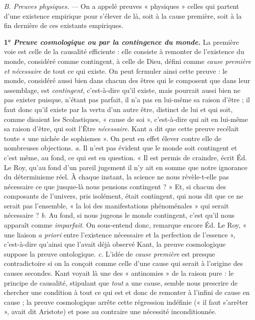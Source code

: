 {\it B. Preuves physiques.} — On a appelé preuves « physiques » celles
qui partent d’une existence empirique pour s'élever de là, soit à la
cause première, soit à la fin dernière de ces existants empiriques.

\vspace{0.24cm}
{\footnotesize
\textbf{1° \textit {\textsf{Preuve cosmologique ou par la contingence du monde.}}}
 La première voie
est celle de la causalité efficiente : elle consiste à remonter de l'existence
du monde, considéré comme contingent, à celle de Dieu, défini comme {\it cause
première et nécessaire} de tout ce qui existe. On peut fcrmuler ainsi cette
preuve : le monde, considéré aussi bien dans chacun des êtres qui le composent
que dans leur assemblage, est {\it contingent}, c'est-à-dire qu'il existe,
mais pourrait aussi bien ne pas exister puisque, n'étant pas parfait, il n’a
pas en lui-même sa raison d’être ; il faut donc qu’il existe par la vertu d’un
autre être, distinct de lui et qui soit, comme disaient les Scolastiques,
« cause de soi », c’est-à-dire qui ait en lui-même sa raison d’être, qui soit
l'Être {\it nécessaire}.
Kant a dit que cette preuve recélait toute « une nichée de sophismes ».
On peut en effet élever contre elle de nombreuses objections. {\it a.} Il n’est pas
évident que le monde soit contingent et c’est même, au fond, ce qui est
en question. « Il est permis de craindre, écrit Éd. Le Roy, qu’au fond
d’un pareil jugement il n’y ait en somme que notre ignorance du déterminisme
réel. À chaque instant, la science ne nous révèle-t-elle pas nécessaire
ce que jusque-là nous pensions contingent ? » Et, si chacun des composants
de l'univers, pris isolément, était contingent, qui nous dit que ce
ne serait pas l'ensemble, « la loi des manifestations phénoménales » qui
serait nécessaire ? {\it b.} Au fond, si nous jugeons le monde contingent, c’est
qu’il nous apparaît comme {\it imparfait}. On sous-entend donc, remarque encore
Éd. Le Roy, « une liaison {\it a priori} entre l'existence nécessaire et la perfection
de l'essence », c’est-à-dire qu’ainsi que l'avait déjà observé Kant, la
preuve cosmologique suppose la preuve ontologique. {\it c.} L'idée de {\it cause
première} est presque contradictoire si on la conçoit comme celle d’une cause
qui serait à l’origine des causes secondes. Kant voyait là une des « antinomies »
de la raison pure : le principe de causalité, stipulant que {\it tout} a une
cause, semble nous prescrire de chercher une condition à tout ce qui est
et donc de remonter à l'infini de cause en cause ; la preuve cosmologique
arrête cette régression indéfinie (« il faut s'arrêter », avait dit Aristote)
et pose au contraire une nécessité inconditionnée.

}
